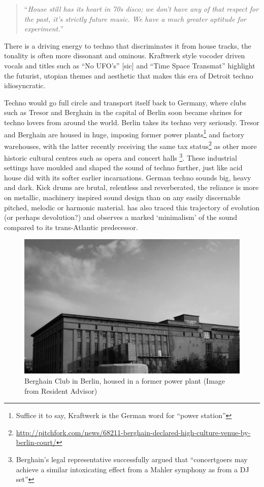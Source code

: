 \blockcquote[]{collins_schedel_wilson_2013}{``\textit{House still has its heart in 70s disco; we don’t have any of that respect for the past, it’s strictly future music. We have a much greater aptitude for experiment.}''}

There is a driving energy to techno that discriminates it from house tracks, the tonality is often more dissonant and ominous. Kraftwerk style vocoder driven vocals and titles such as “No UFO’s” [sic] and “Time Space Transmat” highlight the futurist, utopian themes and aesthetic that makes this era of Detroit techno idiosyncratic. 

Techno would go full circle and transport itself back to Germany, where clubs such as Tresor and Berghain in the capital of Berlin soon became shrines for techno lovers from around the world. Berlin takes its techno very seriously. Tresor and Berghain are housed in huge, imposing former power plants\footnote{Suffice it to say, Kraftwerk is the German word for “power station”} and factory warehouses, with the latter recently receiving the same tax status\footnote{\url{http://pitchfork.com/news/68211-berghain-declared-high-culture-venue-by-berlin-court/}} as other more historic cultural centres such as opera and concert halls \footnote{Berghain’s legal representative successfully argued that “concertgoers may achieve a similar intoxicating effect from a Mahler symphony as from a DJ set”}. These industrial settings have moulded and shaped the sound of techno further, just like acid house did with its softer earlier incarnations. German techno sounds big, heavy and dark. Kick drums are brutal, relentless and reverberated, the reliance is more on metallic, machinery inspired sound design than on any easily discernable pitched, melodic or harmonic material. \cite{Nye2013} has also traced this trajectory of evolution (or perhaps devolution?) and observes a marked `minimalism' of the sound compared to its trans-Atlantic predecessor.

\begin{figure}
	\begin{center}
		\includegraphics[width=\figSizeHundred]{ch02_dancemusic/figures/berghain.jpg}
	\end{center}
	\caption[Berghain Club in Berlin]{Berghain Club in Berlin, housed in a former power plant (Image from Resident Advisor)}
	\label{fig:roland}
\end{figure}

